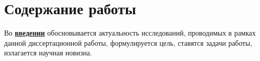 

\section*{Содержание работы}
Во \underline{\textbf{введении}} обосновывается актуальность
исследований, проводимых в рамках данной диссертационной работы,
формулируется цель, ставятся задачи работы, излагается научная новизна.




